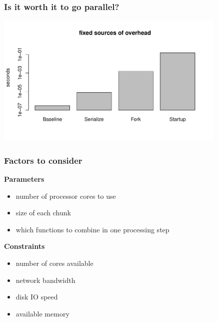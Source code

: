 \documentclass{beamer}
\begin{document}
\begin{frame}


\frametitle{Is it worth it to go parallel?}

    \centerline{\includegraphics[height=2.5in]{../compute_times/overhead}}




\end{frame}
\begin{frame}


    \frametitle{Factors to consider}

\textbf{Parameters}
\begin{itemize}
    \item number of processor cores to use
    \item size of each chunk
    \item which functions to combine in one processing step
\end{itemize}

\textbf{Constraints}
\begin{itemize}
    \item number of cores available
    \item network bandwidth
    \item disk IO speed
    \item available memory
\end{itemize}

\end{frame}
\end{document}
